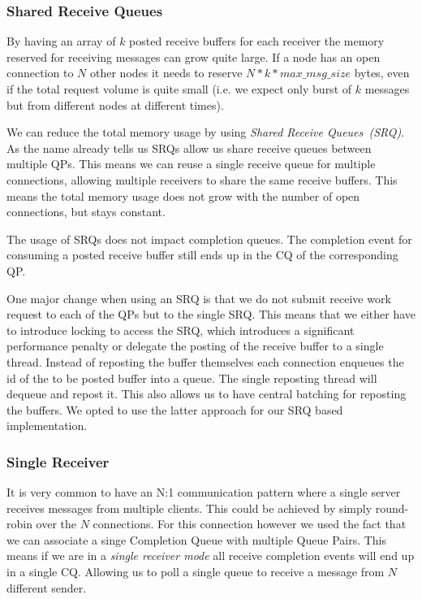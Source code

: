 \subsubsection{Shared Receive Queues} 
By having an array of $k$ posted receive buffers for each receiver the memory reserved for receiving messages can grow quite
large. If a node has an open connection to $N$ other nodes it needs to reserve  $N*k*max\_msg\_size$ bytes, even if 
the total request volume is quite small (i.e. we expect only burst of $k$ messages but from different nodes at different times).

We can reduce the total memory usage by using \emph{Shared Receive Queues~(SRQ)}. As the name already tells us SRQs allow us
share receive queues between multiple QPs. This means we can reuse a single receive queue for multiple connections, allowing
multiple receivers to share the same receive buffers. This means the total memory usage does not grow with the number of
open connections, but stays constant.

The usage of SRQs does not impact completion queues. The completion event for consuming a posted receive buffer still ends up 
in the CQ of the corresponding QP.

One major change when using an SRQ is that we do not submit receive work request to each of the QPs but to the single SRQ. This
means that we either have to introduce locking to access the SRQ, which introduces a significant performance penalty or 
delegate the posting of the receive buffer to a single thread. Instead of reposting the buffer themselves each connection 
enqueues the id of the to be posted buffer into a queue. The single reposting thread will dequeue and repost it. This also
allows us to have central batching for reposting the buffers. We opted to use the latter approach for our SRQ based 
implementation.

\subsubsection{Single Receiver} 
It is very common to have an N:1 communication pattern where a single server receives messages from multiple clients. This
could be achieved by simply round-robin over the $N$ connections. For this connection however we used the fact that we can 
associate a singe Completion Queue with multiple Queue Pairs. This means if we are in a \emph{single receiver mode} all 
receive completion events will end up in a single CQ. Allowing us to poll a single queue to receive a message from $N$ 
different sender.


